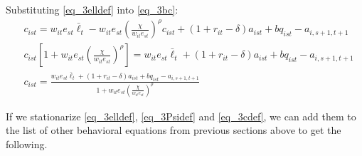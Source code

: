 \documentclass[letterpaper,12pt]{article}
\theoremstyle{definition}
\numberwithin{equation}{section}
\begin{document}
\begin{spacing}{1.5}
	Substituting \eqref{eq_3elldef} into \eqref{eq_3bc}:
	\begin{align}
		& c_{ist} = w_{it} e_{st} \bar \ell_t - w_{it} e_{st} \left(\frac{\chi} {w_{it} e_{st}}\right)^{\rho} c_{ist} + (1+r_{it}-\delta)a_{ist} + bq_{ist} - a_{i,s+1,t+1} \nonumber \\
		& c_{ist} \left[ 1 + w_{it} e_{st} \left(\frac{\chi} {w_{it} e_{st}}\right)^{\rho} \right] = w_{it} e_{st} \bar \ell_t + (1+r_{it}-\delta)a_{ist} + bq_{ist} - a_{i,s+1,t+1} \nonumber \\
		& c_{ist} = \frac{w_{it} e_{st} \bar \ell_t + (1+r_{it}-\delta)a_{ist} + bq_{ist} - a_{i,s+1,t+1}} {1 + w_{it} e_{st} \left(\frac{\chi} {w_{it} e_{st}}\right)^{\rho}} \label{eq_3cdef}
	\end{align}

	If we stationarize \eqref{eq_3elldef}, \eqref{eq_3Psidef} and \eqref{eq_3cdef}, we can add them to the list of other behavioral equations from previous sections above to get the following.


\end{spacing}
\end{document}
